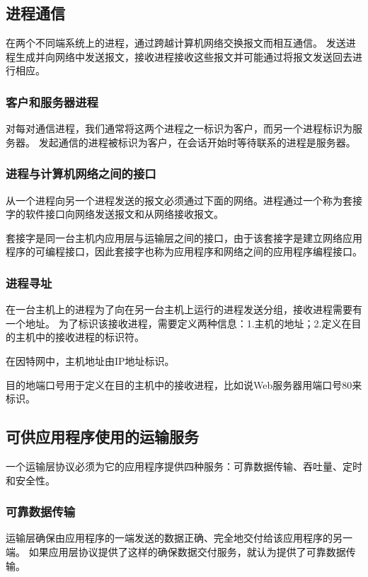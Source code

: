 \documentclass[a4paper,left=2.5cm,right=2.5cm,11pt]{article}
\begin{document}
\subsection{进程通信}
	在两个不同端系统上的进程，通过跨越计算机网络交换报文而相互通信。
	发送进程生成并向网络中发送报文，接收进程接收这些报文并可能通过将报文发送回去进行相应。

\subsubsection{客户和服务器进程}
	对每对通信进程，我们通常将这两个进程之一标识为客户，而另一个进程标识为服务器。
	发起通信的进程被标识为客户，在会话开始时等待联系的进程是服务器。

\subsubsection{进程与计算机网络之间的接口}
	从一个进程向另一个进程发送的报文必须通过下面的网络。进程通过一个称为套接字的软件接口向网络发送报文和从网络接收报文。\par

	套接字是同一台主机内应用层与运输层之间的接口，由于该套接字是建立网络应用程序的可编程接口，因此套接字也称为应用程序和网络之间的应用程序编程接口。

\subsubsection{进程寻址}
	在一台主机上的进程为了向在另一台主机上运行的进程发送分组，接收进程需要有一个地址。
	为了标识该接收进程，需要定义两种信息：1.主机的地址；2.定义在目的主机中的接收进程的标识符。\par

	在因特网中，主机地址由IP地址标识。\par

	目的地端口号用于定义在目的主机中的接收进程，比如说Web服务器用端口号80来标识。

\subsection{可供应用程序使用的运输服务}
	一个运输层协议必须为它的应用程序提供四种服务：可靠数据传输、吞吐量、定时和安全性。

\subsubsection{可靠数据传输}
	运输层确保由应用程序的一端发送的数据正确、完全地交付给该应用程序的另一端。
	如果应用层协议提供了这样的确保数据交付服务，就认为提供了可靠数据传输。
\end{document}
